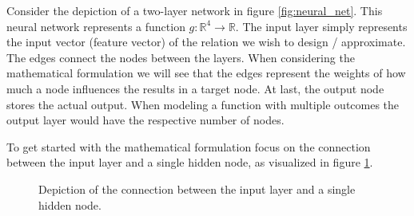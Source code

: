 Consider the depiction of a two-layer network in figure \ref{fig:neural_net}. This
neural network represents a function $g : \mathbb{R}^4 \to \mathbb{R}$. The input layer
simply represents the input vector (feature vector) of the relation we wish to design /
approximate. The edges connect the nodes between the layers. When considering the
mathematical formulation we will see that the edges represent the weights of how much a
node influences the results in a target node. At last, the output node stores the actual
output. When modeling a function with multiple outcomes the output layer would have the
respective number of nodes.

To get started with the mathematical formulation focus on the connection between the
input layer and a single hidden node, as visualized in figure
\ref{fig:neural_net_single_connection}.

\begin{figure}
\centering
{}

\caption{Depiction of the connection between the input layer and a single hidden node.}
\label{fig:neural_net_single_connection}
\end{figure}

